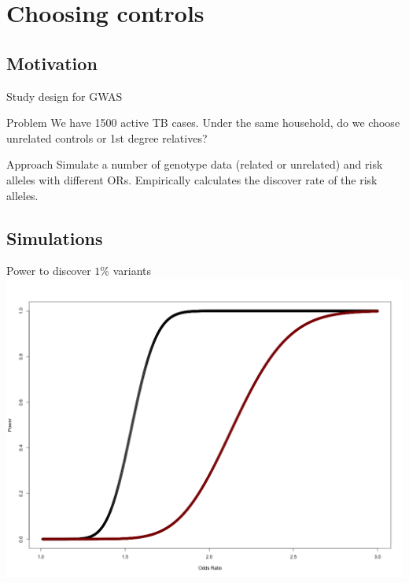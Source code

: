 \documentclass[11pt,xcolor=table]{beamer}
\begin{document}
\section{Choosing controls}
\subsection{Motivation}
\begin{frame}{Study design for GWAS}
\begin{block}{Problem}
We have 1500 active TB cases. Under the same household, do we choose unrelated controls or 1st degree relatives?
\end{block}
\begin{block}{Approach}
Simulate a number of genotype data (related or unrelated) and risk alleles with different ORs. Empirically calculates the discover rate of the risk alleles.
\end{block}
\end{frame}

\subsection{Simulations}
\begin{frame}{Power to discover $1\%$ variants}
\centering
\includegraphics[width=1\textwidth]{pics/power-curve.png}
\end{frame}
\end{document}
